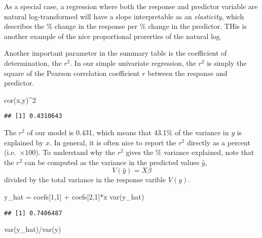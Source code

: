 \documentclass[
]{article}
\newenvironment{Shaded}{\begin{snugshade}}{\end{snugshade}}
\newcommand{\DecValTok}[1]{\textcolor[rgb]{0.00,0.00,0.81}{#1}}
\newcommand{\FunctionTok}[1]{\textcolor[rgb]{0.00,0.00,0.00}{#1}}
\newcommand{\NormalTok}[1]{#1}
\newcommand{\OtherTok}[1]{\textcolor[rgb]{0.56,0.35,0.01}{#1}}
\newcommand{\SpecialCharTok}[1]{\textcolor[rgb]{0.00,0.00,0.00}{#1}}
\begin{document}
As a special case, a regression where both the response and predictor
variable are natural log-transformed will have a slope interpretable as
an \emph{elasticity}, which describes the \% change in the response per
\% change in the predictor. THis is another example of the nice
proportional prorerties of the natural log.

Another important parameter in the summary table is the coefficient of
determination, the \(r^2\). In our simple univariate regression, the
\(r^2\) is simply the square of the Pearson correlation coefficient
\(r\) between the response and predictor.

\begin{Shaded}
\begin{Highlighting}[]
\FunctionTok{cor}\NormalTok{(x,y)}\SpecialCharTok{\^{}}\DecValTok{2}
\end{Highlighting}
\end{Shaded}

\begin{verbatim}
## [1] 0.4310643
\end{verbatim}

The \(r^2\) of our model is 0.431, which means that 43.1\% of the
variance in \(y\) is explained by \(x\). In general, it is often nice to
report the \(r^2\) directly as a percent (i.e.~\(\times 100\)). To
understand why the \(r^2\) gives the \% variance explained, note that
the \(r^2\) can be computed as the variance in the predicted values
\(\hat{y}\), \[V(\hat{y}) = X\beta\] divided by the total variance in
the response varible \(V(y)\).

\begin{Shaded}
\begin{Highlighting}[]
\NormalTok{y\_hat }\OtherTok{=}\NormalTok{ coefs[}\DecValTok{1}\NormalTok{,}\DecValTok{1}\NormalTok{] }\SpecialCharTok{+}\NormalTok{ coefs[}\DecValTok{2}\NormalTok{,}\DecValTok{1}\NormalTok{]}\SpecialCharTok{*}\NormalTok{x}
\FunctionTok{var}\NormalTok{(y\_hat)}
\end{Highlighting}
\end{Shaded}

\begin{verbatim}
## [1] 0.7406487
\end{verbatim}

\begin{Shaded}
\begin{Highlighting}[]
\FunctionTok{var}\NormalTok{(y\_hat)}\SpecialCharTok{/}\FunctionTok{var}\NormalTok{(y)}
\end{Highlighting}
\end{Shaded}
\end{document}
